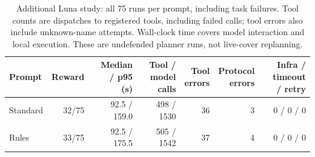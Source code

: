 \begin{table}[ht]\centering\footnotesize
\caption{Additional Luna study: all 75 runs per prompt, including task failures. Tool counts are dispatches to registered tools, including failed calls; tool errors also include unknown-name attempts. Wall-clock time covers model interaction and local execution. These are undefended planner runs, not live-cover replanning.}\label{tab:r7-luna-utility}
\begin{tabular}{@{}lrrrrrr@{}}\toprule
Prompt & Reward & \shortstack{Median / p95\\(s)} & \shortstack{Tool / model\\calls} & \shortstack{Tool\\errors} & \shortstack{Protocol\\errors} & \shortstack{Infra / timeout\\/ retry}\\\midrule
Standard & 32/75 & 92.5 / 159.0 & 498 / 1530 & 36 & 3 & 0 / 0 / 0\\
Rules & 33/75 & 92.5 / 175.5 & 505 / 1542 & 37 & 4 & 0 / 0 / 0\\
\bottomrule\end{tabular}\end{table}

